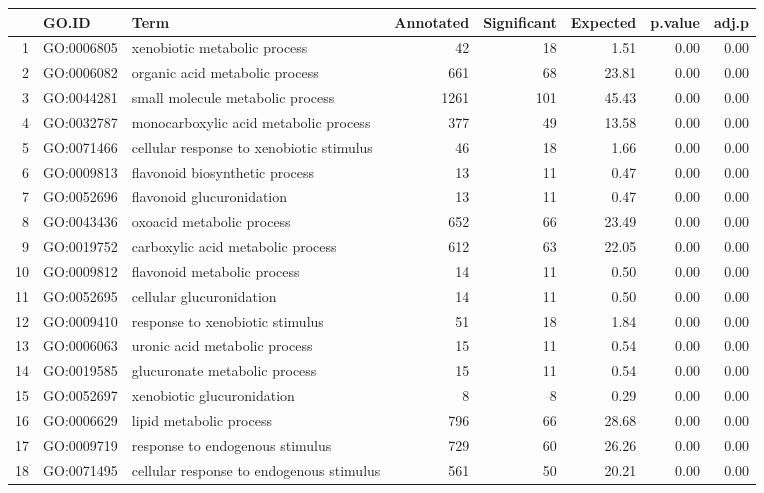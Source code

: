 \begin{table}[ht]
\centering
\begin{tabular}{rllrrrrr}
  \hline
 & GO.ID & Term & Annotated & Significant & Expected & p.value & adj.p \\ 
  \hline
1 & GO:0006805 & xenobiotic metabolic process &  42 &  18 & 1.51 & 0.00 & 0.00 \\ 
  2 & GO:0006082 & organic acid metabolic process & 661 &  68 & 23.81 & 0.00 & 0.00 \\ 
  3 & GO:0044281 & small molecule metabolic process & 1261 & 101 & 45.43 & 0.00 & 0.00 \\ 
  4 & GO:0032787 & monocarboxylic acid metabolic process & 377 &  49 & 13.58 & 0.00 & 0.00 \\ 
  5 & GO:0071466 & cellular response to xenobiotic stimulus &  46 &  18 & 1.66 & 0.00 & 0.00 \\ 
  6 & GO:0009813 & flavonoid biosynthetic process &  13 &  11 & 0.47 & 0.00 & 0.00 \\ 
  7 & GO:0052696 & flavonoid glucuronidation &  13 &  11 & 0.47 & 0.00 & 0.00 \\ 
  8 & GO:0043436 & oxoacid metabolic process & 652 &  66 & 23.49 & 0.00 & 0.00 \\ 
  9 & GO:0019752 & carboxylic acid metabolic process & 612 &  63 & 22.05 & 0.00 & 0.00 \\ 
  10 & GO:0009812 & flavonoid metabolic process &  14 &  11 & 0.50 & 0.00 & 0.00 \\ 
  11 & GO:0052695 & cellular glucuronidation &  14 &  11 & 0.50 & 0.00 & 0.00 \\ 
  12 & GO:0009410 & response to xenobiotic stimulus &  51 &  18 & 1.84 & 0.00 & 0.00 \\ 
  13 & GO:0006063 & uronic acid metabolic process &  15 &  11 & 0.54 & 0.00 & 0.00 \\ 
  14 & GO:0019585 & glucuronate metabolic process &  15 &  11 & 0.54 & 0.00 & 0.00 \\ 
  15 & GO:0052697 & xenobiotic glucuronidation &   8 &   8 & 0.29 & 0.00 & 0.00 \\ 
  16 & GO:0006629 & lipid metabolic process & 796 &  66 & 28.68 & 0.00 & 0.00 \\ 
  17 & GO:0009719 & response to endogenous stimulus & 729 &  60 & 26.26 & 0.00 & 0.00 \\ 
  18 & GO:0071495 & cellular response to endogenous stimulus & 561 &  50 & 20.21 & 0.00 & 0.00 \\ 

\end{tabular}
\end{table}
